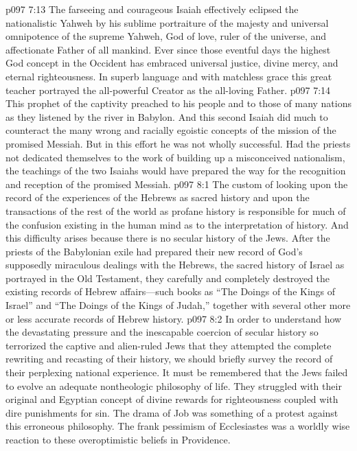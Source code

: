 \vs p097 7:13 The farseeing and courageous Isaiah effectively eclipsed the nationalistic Yahweh by his sublime portraiture of the majesty and universal omnipotence of the supreme Yahweh, God of love, ruler of the universe, and affectionate Father of all mankind. Ever since those eventful days the highest God concept in the Occident has embraced universal justice, divine mercy, and eternal righteousness. In superb language and with matchless grace this great teacher portrayed the all\hyp{}powerful Creator as the all\hyp{}loving Father.
\vs p097 7:14 This prophet of the captivity preached to his people and to those of many nations as they listened by the river in Babylon. And this second Isaiah did much to counteract the many wrong and racially egoistic concepts of the mission of the promised Messiah. But in this effort he was not wholly successful. Had the priests not dedicated themselves to the work of building up a misconceived nationalism, the teachings of the two Isaiahs would have prepared the way for the recognition and reception of the promised Messiah.
\vs p097 8:1 The custom of looking upon the record of the experiences of the Hebrews as sacred history and upon the transactions of the rest of the world as profane history is responsible for much of the confusion existing in the human mind as to the interpretation of history. And this difficulty arises because there is no secular history of the Jews. After the priests of the Babylonian exile had prepared their new record of God’s supposedly miraculous dealings with the Hebrews, the sacred history of Israel as portrayed in the Old Testament, they carefully and completely destroyed the existing records of Hebrew affairs---such books as “The Doings of the Kings of Israel” and “The Doings of the Kings of Judah,” together with several other more or less accurate records of Hebrew history.
\vs p097 8:2 In order to understand how the devastating pressure and the inescapable coercion of secular history so terrorized the captive and alien\hyp{}ruled Jews that they attempted the complete rewriting and recasting of their history, we should briefly survey the record of their perplexing national experience. It must be remembered that the Jews failed to evolve an adequate nontheologic philosophy of life. They struggled with their original and Egyptian concept of divine rewards for righteousness coupled with dire punishments for sin. The drama of Job was something of a protest against this erroneous philosophy. The frank pessimism of Ecclesiastes was a worldly wise reaction to these overoptimistic beliefs in Providence.
